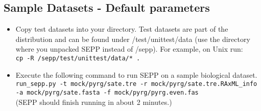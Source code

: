 \documentclass[11pt]{article} %
\newcommand{\sepp}{SEPP\xspace}
\newcommand{\ins}[1]{{\tt #1}}
\newcommand{\file}[1]{{\sf #1}}
\newcommand{\sepphome} {\file{{\raise.17ex\hbox{$\scriptstyle\sim$}}/sepp}\xspace}
\begin{document}
\subsection{Sample Datasets - Default parameters}
\begin{itemize}
\item Copy test datasets into your directory. Test datasets are part of the distribution and can be found under \file{\sepphome/test/unittest/data} (use the directory where you unpacked \sepp instead of \sepphome).
For example, on Unix run:\\ \ins{cp -R \sepphome/test/unittest/data/*  .} 

\item Execute the following command to run \sepp on a sample biological dataset.\\

\ins{run\_sepp.py -t mock/pyrg/sate.tre -r mock/pyrg/sate.tre.RAxML\_info -a mock/pyrg/sate.fasta -f mock/pyrg/pyrg.even.fas} \\

(\sepp should finish running in about 2 minutes.) 
\end{itemize}
\end{document}
